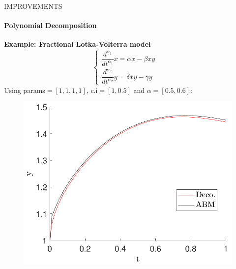 \begin{frame}{IMPROVEMENTS}
\framesubtitle{Polynomial Decomposition}
\textbf{Example: Fractional Lotka-Volterra model}
\begin{equation}
    \begin{cases}{\dfrac{d^{\alpha_1}}{dt^{\alpha_1}}x=\alpha x-\beta x y}& \\[6pt]{\dfrac{d^{\alpha_2}}{dt^{\alpha_2}}y=\delta xy-\gamma y}&\end{cases}
\end{equation}
Using params$=[1,1,1,1]$, c.i$=[1,0.5]$ and $\alpha=[0.5,0.6]$:
\begin{figure}
    \centering
    \includegraphics[scale=0.35]{files/mejoras/pred_preey_frac.pdf}
    \end{figure}

\end{frame}

